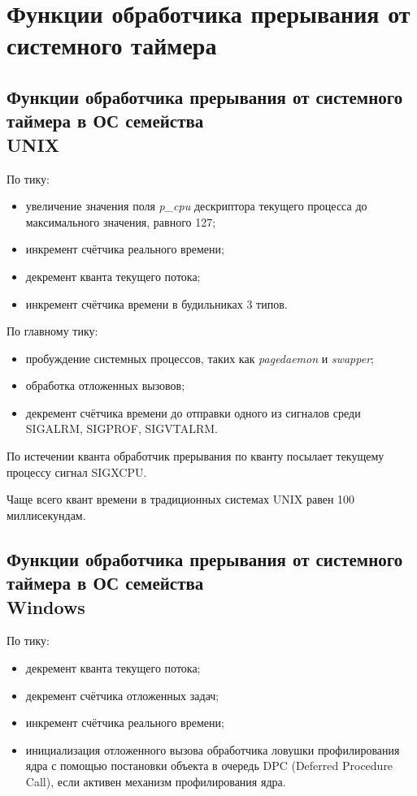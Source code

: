 \tableofcontents
\setcounter{page}{2}
\chapter{Функции обработчика прерывания от системного таймера}

\section[Функции обработчика прерывания от системного таймера в ОС семейства UNIX]
{Функции обработчика прерывания от системного таймера в ОС семейства \\ UNIX}

По тику:
\begin{itemize}
	\item увеличение значения поля \textit{p\_cpu} дескриптора текущего процесса до максимального значения, равного 127;
	\item инкремент счётчика реального времени;
	\item декремент кванта текущего потока;
	\item инкремент счётчика времени в будильниках 3 типов.
\end{itemize}

По главному тику:
\begin{itemize}
	\item пробуждение системных процессов, таких как \textit{pagedaemon} и \textit{swapper};
	\item обработка отложенных вызовов;
	\item декремент счётчика времени до отправки одного из сигналов среди SIGALRM, SIGPROF, SIGVTALRM.
\end{itemize}

По истечении кванта обработчик прерывания по кванту посылает текущему процессу сигнал SIGXCPU.

Чаще всего квант времени в традиционных системах UNIX равен 100 миллисекундам.

\section[Функции обработчика прерывания от системного таймера в ОС семейства Windows]
{Функции обработчика прерывания от системного таймера в ОС семейства \\Windows}

По тику:
\begin{itemize}
	\item декремент кванта текущего потока;
	\item декремент счётчика отложенных задач;
	\item инкремент счётчика реального времени;
	\item инициализация отложенного вызова обработчика ловушки профилирования ядра с помощью 
	постановки объекта в очередь DPC (Deferred Procedure Call), если активен механизм профилирования ядра.
\end{itemize}


